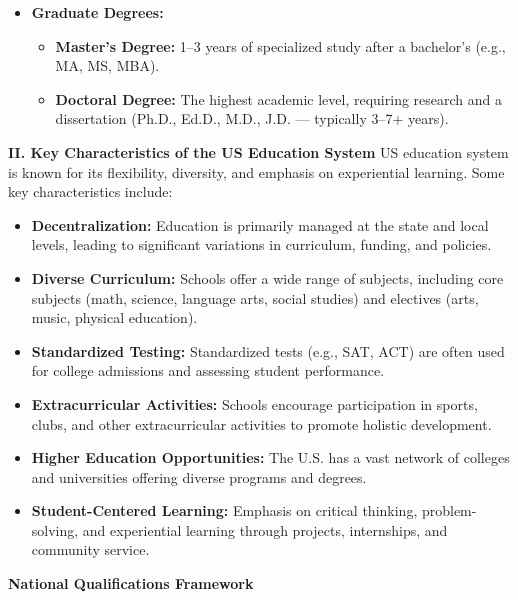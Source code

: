 \begin{enumerate}
\begin{itemize}
\begin{itemize}
            \item \textbf{Graduate Degrees:}
            \begin{itemize}
                \item \textbf{Master's Degree:} 1--3 years of specialized study after a bachelor's (e.g., MA, MS, MBA).
                \item \textbf{Doctoral Degree:} The highest academic level, requiring research and a dissertation (Ph.D., Ed.D., M.D., J.D. — typically 3--7+ years).
            \end{itemize}
        \end{itemize}
    \end{itemize}
\end{enumerate}

\textbf{II. Key Characteristics of the US Education System}
US education system is known for its flexibility, diversity, and emphasis on experiential learning. Some key characteristics include:
\begin{itemize}
    \item \textbf{Decentralization:} Education is primarily managed at the state and local levels, leading to significant variations in curriculum, funding, and policies.
    \item \textbf{Diverse Curriculum:} Schools offer a wide range of subjects, including core subjects (math, science, language arts, social studies) and electives (arts, music, physical education).
    \item \textbf{Standardized Testing:} Standardized tests (e.g., SAT, ACT) are often used for college admissions and assessing student performance.
    \item \textbf{Extracurricular Activities:} Schools encourage participation in sports, clubs, and other extracurricular activities to promote holistic development.
    \item \textbf{Higher Education Opportunities:} The U.S. has a vast network of colleges and universities offering diverse programs and degrees.
    \item \textbf{Student-Centered Learning:} Emphasis on critical thinking, problem-solving, and experiential learning through projects, internships, and community service.
\end{itemize}

\textbf{National Qualifications Framework}

